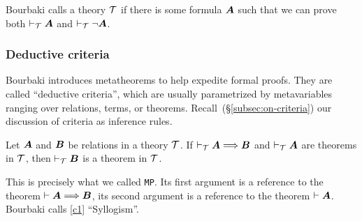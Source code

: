 \begin{definition}\label{defn:contradictory-theory}
Bourbaki calls a theory $\mathcal{T}$  if there is
some formula $\boldsymbol{A}$ such that we can prove both
$\vdash_{\mathcal{T}}\boldsymbol{A}$ and $\vdash_{\mathcal{T}}\neg\boldsymbol{A}$.
\end{definition}

\subsubsection{Deductive criteria}
Bourbaki introduces metatheorems to help expedite formal proofs. They
are called ``deductive criteria'', which are usually parametrized by
metavariables ranging over relations, terms, or
theorems. Recall~(\S\ref{subsec:on-criteria}) our discussion of criteria
as inference rules.

\begin{dc}\label{c1}%
Let $\boldsymbol{A}$ and $\boldsymbol{B}$ be relations in a theory
$\mathcal{T}$. If $\vdash_{\mathcal{T}}\boldsymbol{A}\Longrightarrow\boldsymbol{B}$ 
and $\vdash_{\mathcal{T}}\boldsymbol{A}$ are theorems in $\mathcal{T}$,
then $\vdash_{\mathcal{T}}\boldsymbol{B}$ is a theorem in $\mathcal{T}$.
\end{dc}

\begin{remark*}
This is precisely what we called \texttt{MP}. Its first argument is a
reference to the theorem $\vdash\boldsymbol{A}\Longrightarrow\boldsymbol{B}$,
its second argument is a reference to the theorem $\vdash\boldsymbol{A}$.
Bourbaki calls \ref{c1} ``Syllogism''.
\end{remark*}
